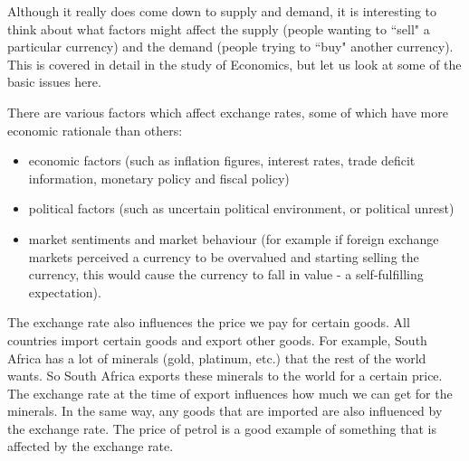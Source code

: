         \label{m39335*id68560}Although it really does come down to supply and demand, it is interesting to think about what factors might affect the supply (people wanting to ``sell" a particular currency) and the demand (people trying to ``buy" another currency). This is covered in detail in the study of Economics, but let us look at some of the basic issues here.\par 
        \label{m39335*id68568}There are various factors which affect exchange rates, some of which have more economic rationale than others:\par 
        \label{m39335*id68573}\begin{itemize}[noitemsep]
            \label{m39335*uid18}\item economic factors (such as inflation figures, interest rates, trade deficit information, monetary policy and fiscal policy)
\label{m39335*uid19}\item political factors (such as uncertain political environment, or political unrest)
\label{m39335*uid20}\item market sentiments and market behaviour (for example if foreign exchange markets perceived a currency to be overvalued and starting selling the currency, this would cause the currency to fall in value - a self-fulfilling expectation).
\end{itemize}
        
\label{m39335*id7324}The exchange rate also influences the price we pay for certain goods. All countries import certain goods and export other goods. For example, South Africa has a lot of minerals (gold, platinum, etc.) that the rest of the world wants. So South Africa exports these minerals to the world for a certain price. The exchange rate at the time of export influences how much we can get for the minerals. In the same way, any goods that are imported are also influenced by the exchange rate. The price of petrol is a good example of something that is affected by the exchange rate. 
\par 
  
\label{m39335*secfhsst!!!underscore!!!id876}
